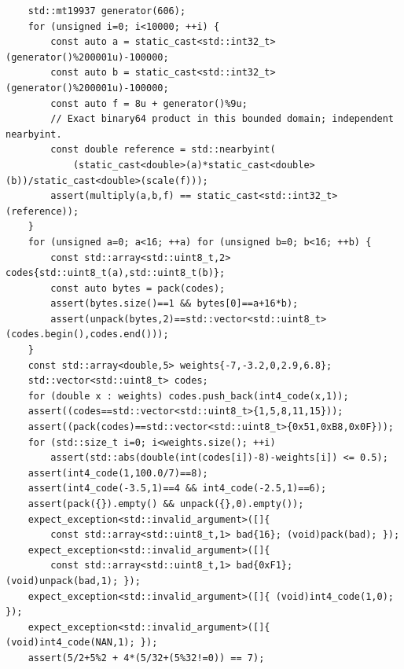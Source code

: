 \begin{verbatim}
    std::mt19937 generator(606);
    for (unsigned i=0; i<10000; ++i) {
        const auto a = static_cast<std::int32_t>(generator()%200001u)-100000;
        const auto b = static_cast<std::int32_t>(generator()%200001u)-100000;
        const auto f = 8u + generator()%9u;
        // Exact binary64 product in this bounded domain; independent nearbyint.
        const double reference = std::nearbyint(
            (static_cast<double>(a)*static_cast<double>(b))/static_cast<double>(scale(f)));
        assert(multiply(a,b,f) == static_cast<std::int32_t>(reference));
    }
    for (unsigned a=0; a<16; ++a) for (unsigned b=0; b<16; ++b) {
        const std::array<std::uint8_t,2> codes{std::uint8_t(a),std::uint8_t(b)};
        const auto bytes = pack(codes);
        assert(bytes.size()==1 && bytes[0]==a+16*b);
        assert(unpack(bytes,2)==std::vector<std::uint8_t>(codes.begin(),codes.end()));
    }
    const std::array<double,5> weights{-7,-3.2,0,2.9,6.8};
    std::vector<std::uint8_t> codes;
    for (double x : weights) codes.push_back(int4_code(x,1));
    assert((codes==std::vector<std::uint8_t>{1,5,8,11,15}));
    assert((pack(codes)==std::vector<std::uint8_t>{0x51,0xB8,0x0F}));
    for (std::size_t i=0; i<weights.size(); ++i)
        assert(std::abs(double(int(codes[i])-8)-weights[i]) <= 0.5);
    assert(int4_code(1,100.0/7)==8);
    assert(int4_code(-3.5,1)==4 && int4_code(-2.5,1)==6);
    assert(pack({}).empty() && unpack({},0).empty());
    expect_exception<std::invalid_argument>([]{
        const std::array<std::uint8_t,1> bad{16}; (void)pack(bad); });
    expect_exception<std::invalid_argument>([]{
        const std::array<std::uint8_t,1> bad{0xF1}; (void)unpack(bad,1); });
    expect_exception<std::invalid_argument>([]{ (void)int4_code(1,0); });
    expect_exception<std::invalid_argument>([]{ (void)int4_code(NAN,1); });
    assert(5/2+5%2 + 4*(5/32+(5%32!=0)) == 7);


\end{verbatim}
